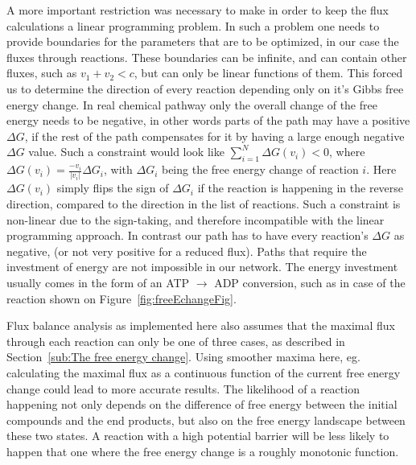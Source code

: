 \documentclass[a4paper,12pt]{article}
\begin{document}
A more important restriction was necessary to make in order to keep the flux calculations a linear programming problem. In such a problem one needs to provide boundaries for the parameters that are to be optimized, in our case the fluxes through reactions. These boundaries can be infinite, and can contain other fluxes, such as $v_1+v_2 < c$, but can only be linear functions of them. This forced us to determine the direction of every reaction depending only on it's Gibbs free energy change. In real chemical pathway only the overall change of the free energy needs to be negative, in other words parts of the path may have a positive $\Delta G$, if the rest of the path compensates for it by having a large enough negative $\Delta G$ value. Such a constraint would look like $\sum_{i=1}^N \Delta G \left( v_i \right)<0$, where $\Delta G \left( v_i \right)=\frac{-v_i}{|v_i|} \Delta G_i$, with $\Delta G_i$ being the free energy change of reaction $i$. Here $\Delta G \left( v_i \right)$ simply flips the sign of $\Delta G_i$ if the reaction is happening in the reverse direction, compared to the direction in the list of reactions. Such a constraint is non-linear due to the sign-taking, and therefore incompatible with the linear programming approach. In contrast our path has to have every reaction's $\Delta G$ as negative, (or not very positive for a reduced flux).
Paths that require the investment of energy are not impossible in our network. The energy investment usually comes in the form of an ATP $\rightarrow$ ADP conversion, such as in case of the reaction shown on Figure~\ref{fig:freeEchangeFig}. 

Flux balance analysis as implemented here also assumes that the maximal flux through each reaction can only be one of three cases, as described in Section~\ref{sub:The free energy change}. Using smoother maxima here, eg. calculating the maximal flux as a continuous function of the current free energy change could lead to more accurate results. The likelihood of a reaction happening not only depends on the difference of free energy between the initial compounds and the end products, but also on the free energy landscape between these two states. A reaction with a high potential barrier will be less likely to happen that one where the free energy change is a roughly monotonic function. 


\end{document}
